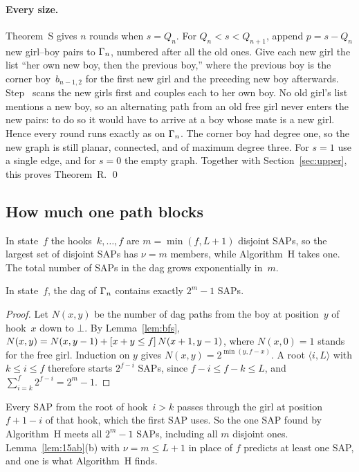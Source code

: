 \paragraph{Every size.}
Theorem~S gives $n$ rounds when $s=Q_n$. For $Q_n<s<Q_{n+1}$, append
$p=s-Q_n$ new girl--boy pairs to $\Gamma_n$, numbered after all the old
ones. Give each new girl the list ``her own new boy, then the previous
boy,'' where the previous boy is the corner boy~$b_{n-1,2}$ for the first
new girl and the preceding new boy afterwards. Step~ scans the new girls
first and couples each to her own boy. No old girl's list mentions a new
boy, so an alternating path from an old free girl never enters the new
pairs: to do so it would have to arrive at a boy whose mate is a new
girl. Hence every round runs exactly as on $\Gamma_n$. The corner boy had
degree one, so the new graph is still planar, connected, and of maximum
degree three. For $s=1$ use a single edge, and for $s=0$ the empty
graph. Together with Section~\ref{sec:upper}, this proves Theorem~R.
\qed

\subsection{How much one path blocks}

In state~$f$ the hooks~$k,\ldots,f$ are $m=\min(f,L+1)$ disjoint SAPs, so
the largest set of disjoint SAPs has $\nu=m$ members, while Algorithm~H
takes one. The total number of SAPs in the dag grows exponentially in~$m$.

\begin{proposition}
In state~$f$, the dag of $\Gamma_n$ contains exactly $2^m-1$ SAPs.
\end{proposition}

\begin{proof}
Let $N(x,y)$ be the number of dag paths from the boy at position~$y$ of
hook~$x$ down to $\bot$. By Lemma~\ref{lem:bfs},
$N(x,y)=N(x,y-1)+[x+y\le f]\,N(x+1,y-1)$, where $N(x,0)=1$ stands
for the free girl. Induction on $y$ gives $N(x,y)=2^{\min(y,f-x)}$. A root
$\langle i,L\rangle$ with $k\le i\le f$ therefore starts $2^{f-i}$ SAPs, since $f-i\le
f-k\le L$, and $\sum_{i=k}^{f}2^{f-i}=2^m-1$.
\end{proof}

Every SAP from the root of hook~$i>k$ passes through the girl at position
$f+1-i$ of that hook, which the first SAP uses. So the one SAP found by
Algorithm~H meets all $2^m-1$ SAPs, including all $m$ disjoint ones.
Lemma~\ref{lem:15ab}(b) with $\nu=m\le L+1$ in place of $f$ predicts at
least one SAP, and one is what Algorithm~H finds.

